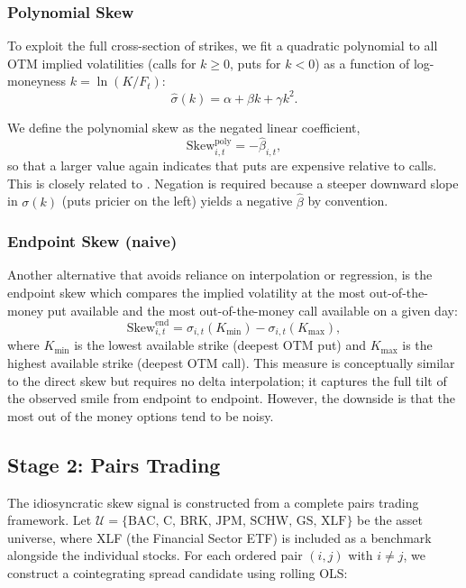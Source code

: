 \documentclass[12pt, a4paper]{article}
\begin{document}
\subsubsection{Polynomial Skew}

To exploit the full cross-section of strikes, we fit a quadratic polynomial to all OTM implied volatilities (calls for $k \geq 0$, puts for $k < 0$) as a function of log-moneyness $k = \ln(K/F_t)$:
\begin{equation}
    \hat{\sigma}(k) = \alpha + \beta k + \gamma k^2.
    \label{eq:smile_fit}
\end{equation}

We define the polynomial skew as the negated linear coefficient,
\begin{equation}
    \mathrm{Skew}^{\mathrm{poly}}_{i,t} = -\hat{\beta}_{i,t},
    \label{eq:skew_poly}
\end{equation}
so that a larger value again indicates that puts are expensive relative to calls. This is closely related to \cite{kalman_filter}. Negation is required because a steeper downward slope in $\sigma(k)$ (puts pricier on the left) yields a negative $\hat\beta$ by convention.

\subsubsection{Endpoint Skew (naive)}
Another alternative that avoids reliance on interpolation or regression, is the endpoint skew which compares the implied volatility at the most out-of-the-money put available and the most out-of-the-money call available on a given day:
\begin{equation}
    \mathrm{Skew}^{\mathrm{end}}_{i,t}
    = \sigma_{i,t}(K_{\min}) - \sigma_{i,t}(K_{\max}),
    \label{eq:skew_endpoints}
\end{equation}
where $K_{\min}$ is the lowest available strike (deepest OTM put) and $K_{\max}$ is the highest available strike (deepest OTM call). This measure is conceptually similar to the direct skew but requires no delta interpolation; it captures the full tilt of the observed smile from endpoint to endpoint. However, the downside is that the most out of the money options tend to be noisy. 

\subsection{Stage 2: Pairs Trading}
\label{sec:pairs_strat}

The idiosyncratic skew signal is constructed from a complete pairs trading framework. Let $\mathcal{U} = \{\text{BAC, C, BRK, JPM, SCHW, GS, XLF}\}$ be the asset universe, where XLF (the Financial Sector ETF) is included as a benchmark alongside the individual stocks. For each ordered pair $(i, j)$ with $i \neq j$, we construct a cointegrating spread candidate using rolling OLS: 
\end{document}
